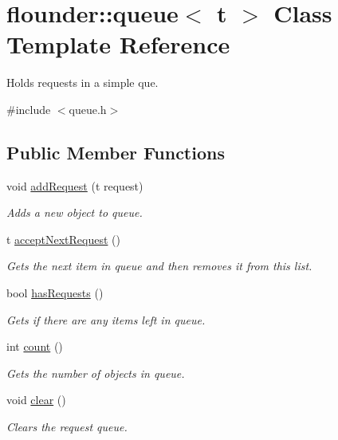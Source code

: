 \hypertarget{classflounder_1_1queue}{}\section{flounder\+:\+:queue$<$ t $>$ Class Template Reference}
\label{classflounder_1_1queue}


Holds requests in a simple que.  




{\ttfamily \#include $<$queue.\+h$>$}

\subsection*{Public Member Functions}
\begin{DoxyCompactItemize}
\item 
void \hyperlink{classflounder_1_1queue_aa2f18bafcb4007630ca63b347b478a66}{add\+Request} (t request)
\begin{DoxyCompactList}\small\item\em Adds a new object to queue. \end{DoxyCompactList}\item 
t \hyperlink{classflounder_1_1queue_a67b97eab69c4ac95fe31d948a569ccce}{accept\+Next\+Request} ()
\begin{DoxyCompactList}\small\item\em Gets the next item in queue and then removes it from this list. \end{DoxyCompactList}\item 
bool \hyperlink{classflounder_1_1queue_adab970a13d2ff675a64848c99d2ba12a}{has\+Requests} ()
\begin{DoxyCompactList}\small\item\em Gets if there are any items left in queue. \end{DoxyCompactList}\item 
int \hyperlink{classflounder_1_1queue_aa424879808961c595a64397dc9097f4e}{count} ()
\begin{DoxyCompactList}\small\item\em Gets the number of objects in queue. \end{DoxyCompactList}\item 
void \hyperlink{classflounder_1_1queue_a6d104250ee0f4cab52dafc908fb926f2}{clear} ()
\begin{DoxyCompactList}\small\item\em Clears the request queue. \end{DoxyCompactList}\end{DoxyCompactItemize}

